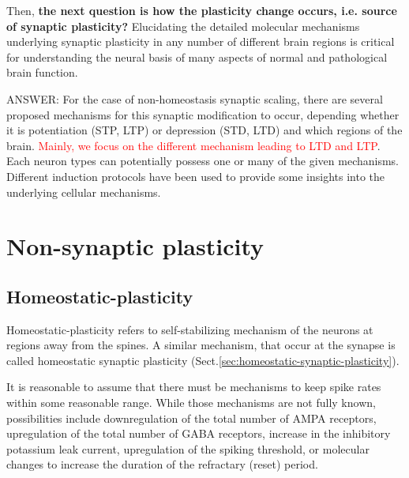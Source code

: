 Then, {\bf the next question is how the plasticity change occurs, i.e.
source of synaptic plasticity?} 
Elucidating the detailed molecular mechanisms underlying synaptic plasticity in
any number of different brain regions is critical for understanding the neural
basis of many aspects of normal and pathological brain function.

ANSWER: For the case of non-homeostasis synaptic scaling, there are several
proposed mechanisms for this synaptic modification to occur, depending whether
it is potentiation (STP, LTP) or depression (STD, LTD) and which regions of the
brain.
\textcolor{red}{Mainly, we focus on the different mechanism leading to LTD and
LTP}. Each neuron types can potentially possess one or many of the given
mechanisms. Different induction protocols have been used to provide some
insights into the underlying cellular mechanisms.








\section{Non-synaptic plasticity}


\subsection{Homeostatic-plasticity}
\label{sec:homeostatic-plasticity}

Homeostatic-plasticity refers to self-stabilizing mechanism of the neurons at
regions away from the spines. A similar mechanism, that occur at the synapse is
called homeostatic synaptic plasticity
(Sect.\ref{sec:homeostatic-synaptic-plasticity}).

  
  It is reasonable to assume that there must be mechanisms to keep spike rates
  within some reasonable range. While those mechanisms are not fully known,
  possibilities include downregulation of the total number of AMPA receptors,
  upregulation of the total number of GABA receptors, increase in the inhibitory
  potassium leak current, upregulation of the spiking threshold, or molecular
  changes to increase the duration of the refractary (reset) period.
  
